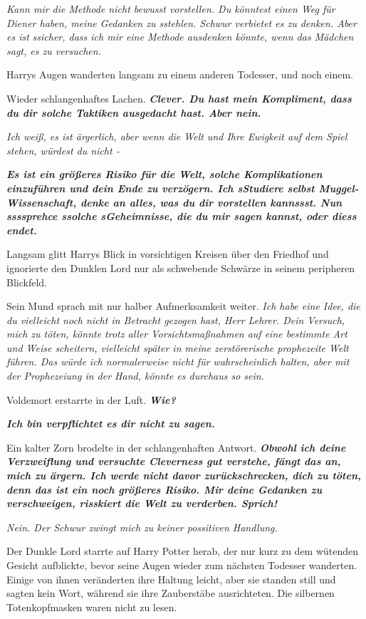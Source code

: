 \glqq{}\emph{Kann mir die Methode nicht bewusst vorstellen. Du könntest einen Weg
für Diener haben, meine Gedanken zu sstehlen. Schwur verbietet es zu denken.
Aber es ist} \emph{ssicher, dass ich mir eine Methode ausdenken könnte, wenn das
Mädchen sagt, es zu versuchen.}\grqq{}

Harrys Augen wanderten langsam zu einem anderen Todesser, und noch einem.

Wieder schlangenhaftes Lachen. \glqq{}\textbf{\emph{Clever. Du hast mein
Kompliment, dass du dir solche Taktiken ausgedacht hast. Aber nein.}}\grqq{}

\glqq{}\emph{Ich weiß, es ist ärgerlich, aber wenn die Welt und Ihre Ewigkeit auf
dem Spiel stehen, würdest du nicht -}\grqq{}

\glqq{}\textbf{\emph{Es ist ein größeres Risiko für die Welt, solche
Komplikationen einzuführen und dein Ende zu verzögern. Ich sStudiere selbst
Muggel-Wissenschaft, denke an alles, was du dir vorstellen kannssst. Nun
ssssprehce ssolche sGeheimnisse, die du mir sagen kannst, oder diess endet.}}\grqq{}

Langsam glitt Harrys Blick in vorsichtigen Kreisen über den Friedhof und
ignorierte den Dunklen Lord nur als schwebende Schwärze in seinem peripheren
Blickfeld.

Sein Mund sprach mit nur halber Aufmerksamkeit weiter. \glqq{}\emph{Ich habe eine
Idee, die du vielleicht noch nicht in Betracht gezogen hast, Herr Lehrer. Dein
Versuch, mich zu töten, könnte trotz aller Vorsichtsmaßnahmen auf eine bestimmte
Art und Weise scheitern, vielleicht später in meine zerstörerische prophezeite
Welt führen. Das würde ich normalerweise nicht für wahrscheinlich halten, aber
mit der Prophezeiung in der Hand, könnte es durchaus so sein}.\grqq{}

Voldemort erstarrte in der Luft. \glqq{}\textbf{\emph{Wie?}}\grqq{}

\glqq{}\textbf{\emph{Ich bin verpflichtet es dir nicht zu sagen.}}\grqq{}

Ein kalter Zorn brodelte in der schlangenhaften Antwort. \glqq{}
\textbf{\emph{Obwohl ich deine Verzweiflung und versuchte Cleverness gut
verstehe, fängt das an, mich zu ärgern. Ich werde nicht davor zurückschrecken,
dich zu töten, denn das ist ein noch größeres Risiko. Mir deine Gedanken zu
verschweigen, risskiert die Welt zu verderben. Sprich!}}\grqq{}

\glqq{}\emph{Nein. Der Schwur zwingt mich zu keiner possitiven Handlung.}\grqq{}

Der Dunkle Lord starrte auf Harry Potter herab, der nur kurz zu dem wütenden
Gesicht aufblickte, bevor seine Augen wieder zum nächsten Todesser wanderten.
Einige von ihnen veränderten ihre Haltung leicht, aber sie standen still und
sagten kein Wort, während sie ihre Zauberstäbe ausrichteten. Die silbernen
Totenkopfmasken waren nicht zu lesen.

